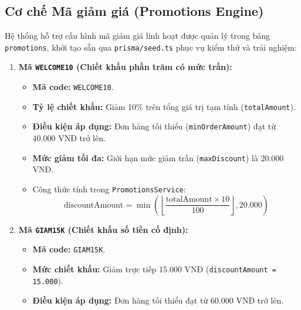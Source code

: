 \documentclass[12pt,a4paper,oneside]{report}
\begin{document}
\subsection{Cơ chế Mã giảm giá (Promotions Engine)}
Hệ thống hỗ trợ cấu hình mã giảm giá linh hoạt được quản lý trong bảng \texttt{promotions}, khởi tạo sẵn qua \texttt{prisma/seed.ts} phục vụ kiểm thử và trải nghiệm:
\begin{enumerate}
    \item \textbf{Mã \texttt{WELCOME10} (Chiết khấu phần trăm có mức trần):}
    \begin{itemize}
        \item \textbf{Mã code:} \texttt{WELCOME10}.
        \item \textbf{Tỷ lệ chiết khấu:} Giảm 10\% trên tổng giá trị tạm tính (\texttt{totalAmount}).
        \item \textbf{Điều kiện áp dụng:} Đơn hàng tối thiểu (\texttt{minOrderAmount}) đạt từ 40.000 VNĐ trở lên.
        \item \textbf{Mức giảm tối đa:} Giới hạn mức giảm trần (\texttt{maxDiscount}) là 20.000 VNĐ.
        \item Công thức tính trong \texttt{PromotionsService}:
        \[
        \text{discountAmount} = \min\left( \left\lfloor \frac{\text{totalAmount} \times 10}{100} \right\rfloor, 20.000 \right)
        \]
    \end{itemize}
    \item \textbf{Mã \texttt{GIAM15K} (Chiết khấu số tiền cố định):}
    \begin{itemize}
        \item \textbf{Mã code:} \texttt{GIAM15K}.
        \item \textbf{Mức chiết khấu:} Giảm trực tiếp 15.000 VNĐ (\texttt{discountAmount = 15.000}).
        \item \textbf{Điều kiện áp dụng:} Đơn hàng tối thiểu đạt từ 60.000 VNĐ trở lên.
    \end{itemize}
\end{enumerate}
\end{document}
